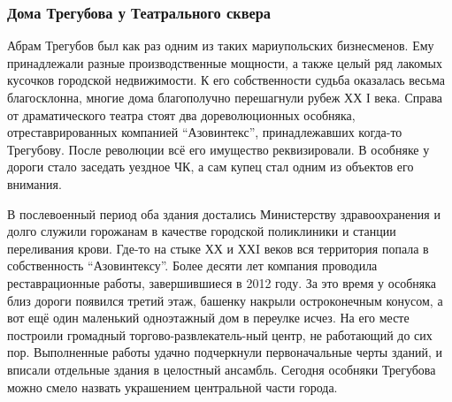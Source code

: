  
 
 
 
 

\subsubsection{Дома Трегубова у Театрального сквера}

Абрам Трегубов был как раз одним из таких мариупольских бизнесменов. Ему
принадлежали разные производственные мощности, а также целый ряд лакомых
кусочков городской недвижимости. К его собственности судьба оказалась весьма
благосклонна, многие дома благополучно перешагнули рубеж ХХ І века. Справа от
драматического театра стоят два дореволюционных особняка, отреставрированных
компанией \enquote{Азовинтекс}, принадлежавших когда-то Трегубову. После революции всё
его имущество реквизировали. В особняке у дороги стало заседать уездное ЧК, а
сам купец стал одним из объектов его внимания.


В послевоенный период оба здания достались Министерству здравоохранения и долго
служили горожанам в качестве городской поликлиники и станции переливания крови.
Где-то на стыке ХХ и ХХI веков вся территория попала в собственность
\enquote{Азовинтексу}. Более десяти лет компания проводила реставрационные
работы, завершившиеся в 2012 году. За это время у особняка близ дороги появился
третий этаж, башенку накрыли остроконечным конусом, а вот ещё один маленький
одноэтажный дом в переулке исчез. На его месте построили громадный
торгово-развлекатель\hyp{}ный центр, не работающий до сих пор. Выполненные работы
удачно подчеркнули первоначальные черты зданий, и вписали отдельные здания в
целостный ансамбль. Сегодня особняки Трегубова можно смело назвать украшением
центральной части города.

